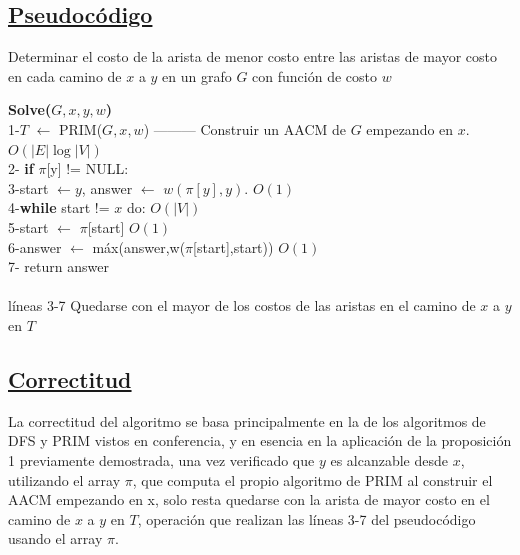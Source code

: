 \documentclass{article}
\begin{document}
    \subsection{\underline{Pseudoc\'odigo}}
    \begin{algorithm}[H]
        \caption{Determinar el costo de la arista de menor costo entre las aristas de mayor costo en cada camino de $x$ a $y$ en un grafo $G$ con funci\'on de costo $w$}
        \textbf{Solve($G,x,y,w$)\\} 
        1-\hspace*{1em}$T$ $\leftarrow$ PRIM($G,x,w$) --------- Construir un AACM de $G$ empezando en $x$. $O(|E|\log{|V|})$\\
        2-\hspace*{1em} \textbf{if} $\pi$[y] != NULL:\\
        3-\hspace*{2em}start $\leftarrow y$, answer $\leftarrow$ $w(\pi[y],y)$. $O(1)$\\ 
        4-\hspace*{2em}\textbf{while} start != $x$ do:  $O(|V|)$\\
        5-\hspace*{3em}start $\leftarrow$ $\pi$[start] $O(1)$\\
        6-\hspace*{3em}answer $\leftarrow$ m\'ax(answer,w($\pi$[start],start)) $O(1)$\\
        7-\hspace*{2em} return answer\\\\
        
        l\'ineas 3-7 Quedarse con el mayor de los costos de las aristas en el camino de $x$ a $y$ en $T$
    \end{algorithm}

    \subsection{\underline{Correctitud}}

    La correctitud del algoritmo se basa principalmente en la de los algoritmos de DFS y PRIM vistos en conferencia, y en esencia en 
    la aplicaci\'on de la proposici\'on 1 previamente demostrada, una vez verificado que $y$ es alcanzable desde $x$, utilizando el array 
    $\pi$, que computa el propio algoritmo de PRIM al construir el AACM empezando en x, solo resta quedarse con la arista de mayor costo 
    en el camino de $x$ a $y$ en $T$, operaci\'on que realizan las l\'ineas 3-7 del pseudoc\'odigo usando el array $\pi$.
\end{document}
